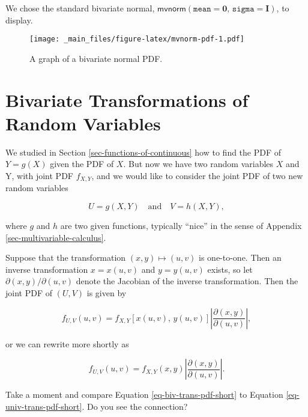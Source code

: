 \documentclass[]{book}
\numberwithin{equation}{chapter}
\numberwithin{figure}{chapter}
\theoremstyle{plain}
\theoremstyle{definition}
\theoremstyle{remark}
\theoremstyle{definition}
\theoremstyle{definition}
\theoremstyle{remark}
\begin{document}
We chose the standard bivariate normal,
\(\mathsf{mvnorm}(\mathtt{mean}=\mathbf{0},\,\mathtt{sigma}=\mathbf{I})\),
to display.

\begin{figure}[htbp]
\centering
\texttt{[image: \_main\_files/figure-latex/mvnorm-pdf-1.pdf]}
\caption{\label{fig:mvnorm-pdf}\small A graph of a bivariate normal PDF.}
\end{figure}



\section{Bivariate Transformations of Random
Variables}\label{sec-transformations-multivariate}

We studied in Section \ref{sec-functions-of-continuous} how to find the
PDF of \(Y=g(X)\) given the PDF of \(X\). But now we have two random
variables \(X\) and Y, with joint PDF \(f_{X,Y}\), and we would like to
consider the joint PDF of two new random variables

\begin{equation}
U=g(X,Y)\quad \mbox{and}\quad V=h(X,Y),
\end{equation}

where \(g\) and \(h\) are two given functions, typically ``nice'' in the
sense of Appendix \ref{sec-multivariable-calculus}.

Suppose that the transformation \((x,y)\longmapsto(u,v)\) is one-to-one.
Then an inverse transformation \(x=x(u,v)\) and \(y=y(u,v)\) exists, so
let \(\partial(x,y)/\partial(u,v)\) denote the Jacobian of the inverse
transformation. Then the joint PDF of \((U,V)\) is given by

\begin{equation}
f_{U,V}(u,v)=f_{X,Y}\left[x(u,v),\, y(u,v)\right]\left|\frac{\partial(x,y)}{\partial(u,v)}\right|,
\end{equation}

or we can rewrite more shortly as

\begin{equation}
\label{eq-biv-trans-pdf-short}
f_{U,V}(u,v)=f_{X,Y}(x,y)\left|\frac{\partial(x,y)}{\partial(u,v)}\right|.
\end{equation}

Take a moment and compare Equation \eqref{eq-biv-trans-pdf-short} to
Equation \eqref{eq-univ-trans-pdf-short}. Do you see the connection?

\bigskip
\end{document}

